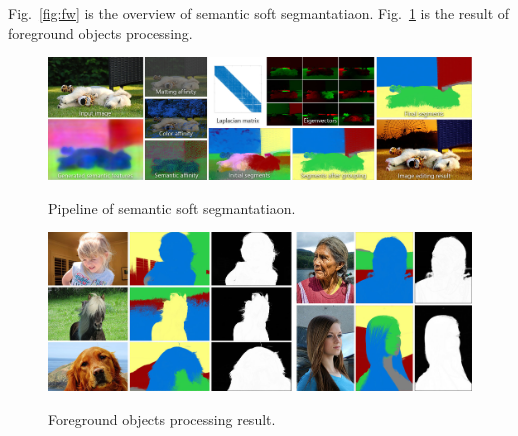 \documentclass[]{IEEEtran}
\begin{document}
	Fig.~\ref{fig:fw} is the overview of semantic soft segmantatiaon. Fig.~\ref{fig:rt} is the result of foreground objects processing.
	


\newpage
\begin{figure}[!hbt]
		\vspace{1.7cm}
		\begin{center}
			\includegraphics[width=\columnwidth]{fw}
			\caption{Pipeline of semantic soft segmantatiaon.}
			\label{fig:fw}
		    \hspace{0.5cm}
			\includegraphics[width=\columnwidth]{rs}
			\caption{Foreground objects processing result.}
			\label{fig:rt}
		\end{center}
	\end{figure}

%
%
%
%
%
%

\end{document}
